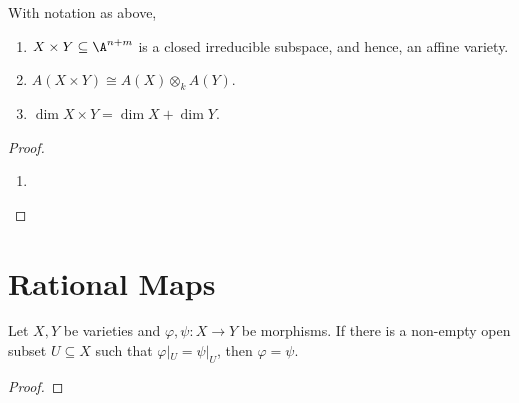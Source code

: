 \begin{proposition}
    With notation as above, 
    \begin{enumerate}[label=(\alph*)]
        \item $X\times Y\subseteq\A^{n + m}$ is a closed irreducible subspace, and hence, an affine variety.
        \item $A(X\times Y)\cong A(X)\otimes_k A(Y)$.
        \item $\dim X\times Y = \dim X + \dim Y$.
    \end{enumerate}
\end{proposition}
\begin{proof}
\begin{enumerate}[label=(\alph*)]
    \item 
\end{enumerate}
\end{proof}

\begin{definition}
    
\end{definition}

\section{Rational Maps}

\begin{lemma}
    Let $X, Y$ be varieties and $\varphi,\psi: X\to Y$ be morphisms. If there is a non-empty open subset $U\subseteq X$ such that $\varphi|_U = \psi|_U$, then $\varphi = \psi$.
\end{lemma}
\begin{proof}
\end{proof}

\begin{definition}
\end{definition}